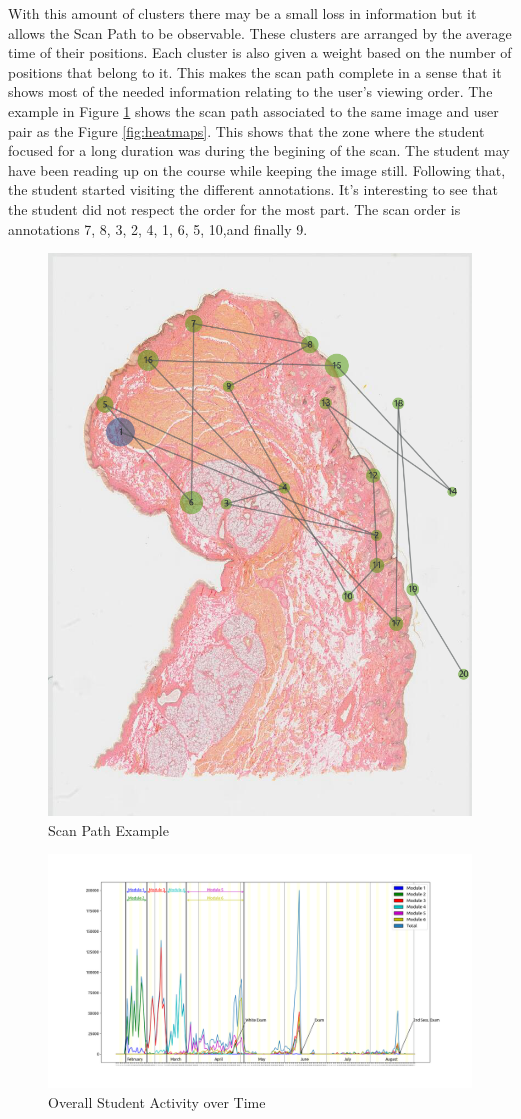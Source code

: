 \documentclass[a4paper,11pt]{report}
\numberwithin{figure}{section} %
\begin{document}
\begin{itemize}
        With this amount of clusters there may be a small loss in information but it allows the Scan Path to be observable.
        These clusters are arranged by the average time of their positions.
        Each cluster is also given a weight based on the number of positions that belong to it.
        This makes the scan path complete in a sense that it shows most of the needed information relating to the user's viewing order.
        The example in Figure \ref{fig:scanpath} shows the scan path associated to the same image and user pair as the Figure \ref{fig:heatmaps}.
        This shows that the zone where the student focused for a long duration was during the begining of the scan.
        The student may have been reading up on the course while keeping the image still.
        Following that, the student started visiting the different annotations.
        It's interesting to see that the student did not respect the order for the most part.
        The scan order is annotations 7, 8, 3, 2, 4, 1, 6, 5, 10,and finally 9.
          \begin{figure}[H]
          \centering
          \includegraphics[width=.3\linewidth]{images/5501147_scanpath.png}
          \caption{Scan Path Example}
          \label{fig:scanpath}
    \end{figure}
    \end{itemize}

    \begin{figure}[H]
      \centering
      \includegraphics[width=.9\linewidth]{images/timelapse.png}
      \caption{Overall Student Activity over Time}
      \label{fig:timelapse}
    \end{figure}
\end{document}
